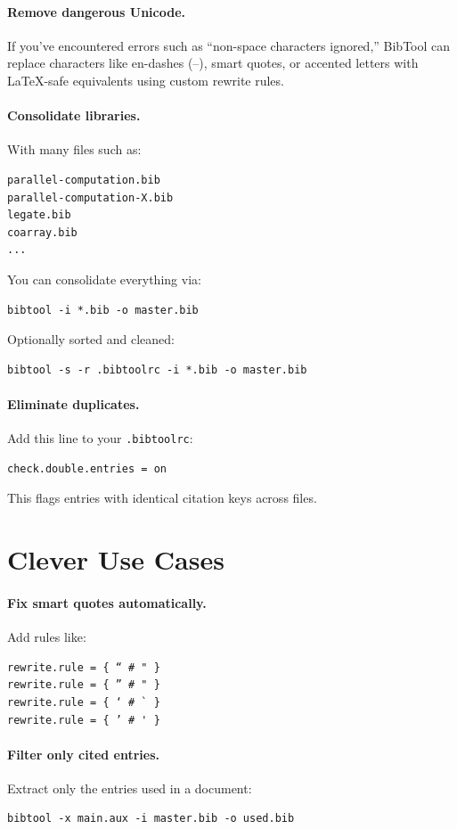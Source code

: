 \documentclass[12pt]{article}
\begin{document}
\paragraph{Remove dangerous Unicode.} If you've encountered errors such as ``non-space characters ignored,'' BibTool can replace characters like en-dashes (–), smart quotes, or accented letters with LaTeX-safe equivalents using custom rewrite rules.

\paragraph{Consolidate libraries.} With many files such as:
\begin{verbatim}
parallel-computation.bib
parallel-computation-X.bib
legate.bib
coarray.bib
...
\end{verbatim}
You can consolidate everything via:
\begin{verbatim}
bibtool -i *.bib -o master.bib
\end{verbatim}
Optionally sorted and cleaned:
\begin{verbatim}
bibtool -s -r .bibtoolrc -i *.bib -o master.bib
\end{verbatim}

\paragraph{Eliminate duplicates.} Add this line to your \texttt{.bibtoolrc}:
\begin{verbatim}
check.double.entries = on
\end{verbatim}
This flags entries with identical citation keys across files.

\section{Clever Use Cases}

\paragraph{Fix smart quotes automatically.} Add rules like:
\begin{Verbatim}
rewrite.rule = { “ # " }
rewrite.rule = { ” # " }
rewrite.rule = { ‘ # ` }
rewrite.rule = { ’ # ' }
\end{Verbatim}

\paragraph{Filter only cited entries.} Extract only the entries used in a document:
\begin{verbatim}
bibtool -x main.aux -i master.bib -o used.bib
\end{verbatim}
\end{document}
